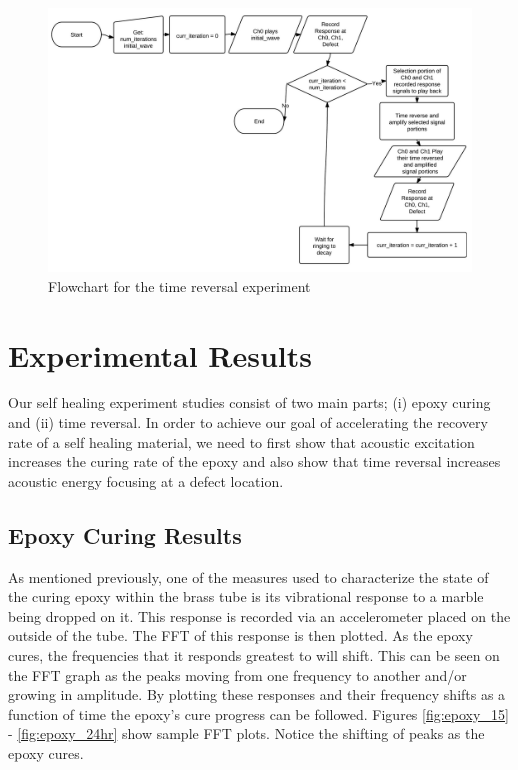 \documentclass[]{aiaa-tc}%
\begin{document}
\begin{figure}[H]%
 \includegraphics{new_flow_chart}
 \centering
 \caption{Flowchart for the time reversal experiment}
 \label{fig:tr_flowchart}
\end{figure}

\section{Experimental Results}
Our self healing experiment studies consist of two main parts; (i) epoxy curing and (ii) time reversal. In order to achieve our goal of accelerating the recovery rate of a self healing material, we need to first show that acoustic excitation increases the curing rate of the epoxy and also show that time reversal increases acoustic energy focusing at a defect location. 

\subsection{Epoxy Curing Results}

As mentioned previously, one of the measures used to characterize the state of the curing epoxy within the brass tube is its vibrational response to a marble being dropped on it. This response is recorded via an accelerometer placed on the outside of the tube. The FFT of this response is then plotted. As the epoxy cures, the frequencies that it responds greatest to will shift. This can be seen on the FFT graph as the peaks moving from one frequency to another and/or growing in amplitude. By plotting these responses and their frequency shifts as a function of time the epoxy’s cure progress can be followed. Figures \ref{fig:epoxy_15} - \ref{fig:epoxy_24hr} show sample FFT plots. Notice the shifting of peaks as the epoxy cures.
\end{document}

